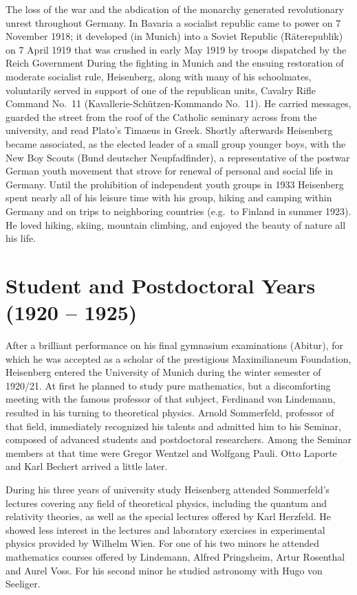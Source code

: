 \documentclass{article}
\begin{document}
The loss of the war and the abdication of the monarchy generated revolutionary unrest throughout Germany. In Bavaria a socialist republic came to power on 7 November 1918; it developed (in Munich) into a Soviet Republic (Räterepublik) on 7 April 1919 that was crushed in early May 1919 by troops dispatched by the Reich Government During the fighting in Munich and the ensuing restoration of moderate socialist rule, Heisenberg, along with many of his schoolmates, voluntarily served in support of one of the republican units, Cavalry Rifle Command No.~11 (Kavallerie-Schützen-Kommando No.~11). He carried messages, guarded the street from the roof of the Catholic seminary across from the university, and read Plato's Timaeus in Greek. Shortly afterwards Heisenberg became associated, as the elected leader of a small group younger boys, with the New Boy Scouts (Bund deutscher Neupfadfinder), a representative of the postwar German youth movement that strove for renewal of personal and social life in Germany. Until the prohibition of independent youth groups in 1933 Heisenberg spent nearly all of his leisure time with his group, hiking and camping within Germany and on trips to neighboring countries (e.g.~to Finland in summer 1923). He loved hiking, skiing, mountain climbing, and enjoyed the beauty of nature all his life.

\section{Student and Postdoctoral Years (1920 – 1925)}

After a brilliant performance on his final gymnasium examinations (Abitur), for which he was accepted as a scholar of the prestigious Maximilianeum Foundation, Heisenberg entered the University of Munich during the winter semester of 1920/21. At first he planned to study pure mathematics, but a discomforting meeting with the famous professor of that subject, Ferdinand von Lindemann, resulted in his turning to theoretical physics. Arnold Sommerfeld, professor of that field, immediately recognized his talents and admitted him to his Seminar, composed of advanced students and postdoctoral researchers. Among the Seminar members at that time were Gregor Wentzel and Wolfgang Pauli. Otto Laporte and Karl Bechert arrived a little later.

During his three years of university study Heisenberg attended Sommerfeld's lectures covering any field of theoretical physics, including the quantum and relativity theories, as well as the special lectures offered by Karl Herzfeld. He showed less interest in the lectures and laboratory exercises in experimental physics provided by Wilhelm Wien. For one of his two minors he attended mathematics courses offered by Lindemann, Alfred Pringsheim, Artur Rosenthal and Aurel Voss. For his second minor he studied astronomy with Hugo von Seeliger.
\end{document}
